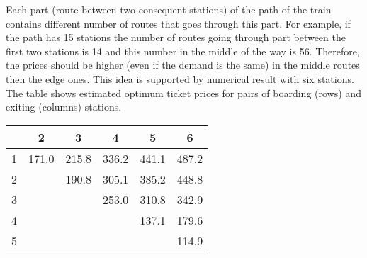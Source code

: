 Each part (route between two consequent stations) of the path of the train contains different number of routes that goes through this part. For example, if the path has 15 stations the number of routes going through part between the first two stations is 14 and this number in the middle of the way is 56. Therefore, the prices should be higher (even if the demand is the same) in the middle routes then the edge ones. This idea is supported by numerical result with six stations. The table shows estimated optimum ticket prices for pairs of boarding (rows) and exiting (columns) stations.

\begin{center}
			\begin{tabular}{cccccc}
				\hline
				 & 2 & 3 & 4 & 5 & 6 \\ 
				\hline
				1 & 171.0 & 215.8 & 336.2 & 441.1 & 487.2 \\ 
				2 &  & 190.8 & 305.1 & 385.2 & 448.8 \\ 
				3 &  &  & 253.0 & 310.8 & 342.9 \\ 
				4 &  &  &  & 137.1 & 179.6 \\ 
				5 &  &  &  &  & 114.9 \\ 
				 \hline
			\end{tabular}    
\end{center}